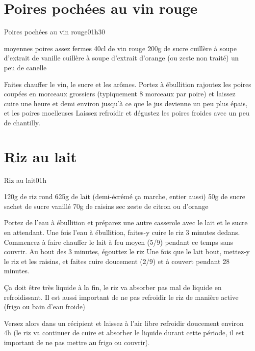 {\section{Poires pochées au vin rouge}
\begin{recette}{Poires pochées au vin rouge}{0}{1h30}{}
\begin{ingredients}
 moyennes poires assez fermes
\ingredient 40cl de vin rouge
\ingredient 200g de sucre
 cuillère à soupe d'extrait de vanille
 cuillère à soupe d'extrait d'orange (ou zeste non traité)
\ingredient un peu de canelle
\end{ingredients}

\begin{preparation}
\etape Faites chauffer le vin, le sucre et les arômes. Portez à ébullition
\etape rajoutez les poires coupées en morceaux grossiers (typiquement 8 morceaux par poire) et laissez cuire une heure et demi 
environ jusqu'à ce que le jus devienne un peu plus épais, et les poires moelleuses
\etape Laissez refroidir et dégustez les poires froides avec un peu de chantilly.
\end{preparation}
\end{recette}

\section{Riz au lait}
\begin{recette}{Riz au lait}{0}{1h}{}
\begin{ingredients}[4 pers.]
\ingredient 120g de riz rond
\ingredient 625g de lait (demi-écrémé ça marche, entier aussi)
\ingredient 50g de sucre
 sachet de sucre vanillé
\ingredient 70g de raisins sec
\ingredient zeste de citron ou d'orange
\end{ingredients}

\begin{preparation}
\etape Portez de l'eau à ébullition et préparez une autre casserole avec le lait et le sucre en attendant.
\etape Une fois l'eau à ébullition, faites-y cuire le riz 3 minutes dedans. Commencez à faire chauffer le lait à feu moyen (5/9) pendant ce temps sans couvrir. 
\etape Au bout des 3 minutes, égouttez le riz
\etape Une fois que le lait bout, mettez-y le riz et les raisins, et faites cuire doucement (2/9) et à couvert pendant 28 minutes. 
\begin{remarque}
Ça doit être très liquide à la fin, le riz va absorber pas mal de liquide en refroidissant. Il est aussi important de ne pas refroidir le riz de manière active (frigo ou bain d'eau froide)
\end{remarque}
\etape Versez alors dans un récipient et laissez à l'air libre refroidir doucement environ 4h (le riz va continuer de cuire et absorber le liquide durant cette période, il est important de ne pas mettre au frigo ou couvrir).
\end{preparation}
\end{recette}

}
